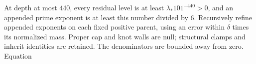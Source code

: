 At depth at most $440$, every residual level is at least
$\lambda_*101^{-440}>0$, and an appended prime exponent is at
least this number divided by $6$.  Recursively refine appended
exponents on each fixed positive parent, using an error within
$\delta$ times its normalized mass.  Proper cap and knot walls are
null; structural clamps and inherit identities are retained.
The denominators are bounded away from zero.  Equation
